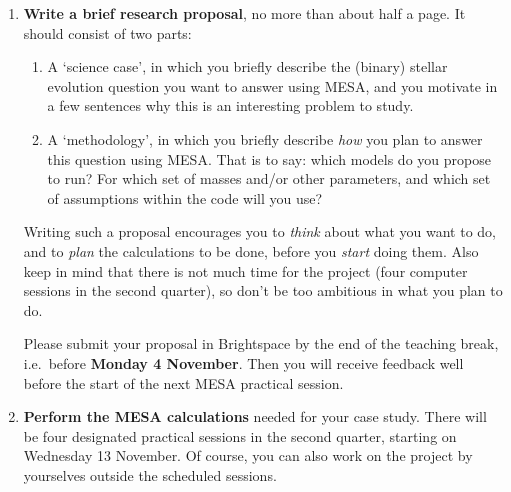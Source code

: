 \documentclass[11pt,a4paper]{article}
\begin{document}
\begin{enumerate}
\item \textbf{Write a brief research proposal}, no more than about half a page. It should consist of two parts:
  \begin{enumerate}
  \item A `science case', in which you briefly describe the (binary) stellar evolution question you want to answer using MESA, and you motivate in a few sentences why this is an interesting problem to study.
  \item A `methodology', in which you briefly describe \emph{how} you plan to answer this question using MESA. That is to say: which models do you propose to run? For which set of masses and/or other parameters, and which set of assumptions within the code will you use?
  \end{enumerate}
Writing such a proposal encourages you to \emph{think} about what you want to do, and to \emph{plan} the calculations to be done, before you \emph{start} doing them. Also keep in mind that there is not much time for the project (four computer sessions in the second quarter), so don't be too ambitious in what you plan to do.

Please submit your proposal in Brightspace by the end of the teaching break, i.e.\ before \textbf{Monday 4 November}. Then you will receive feedback well before the start of the next MESA practical session.

\item \textbf{Perform the MESA calculations} needed for your case study. There will be four designated practical sessions in the second quarter, starting on Wednesday 13 November. Of course, you can also work on the project by yourselves outside the scheduled sessions.


\end{enumerate}
\end{document}
